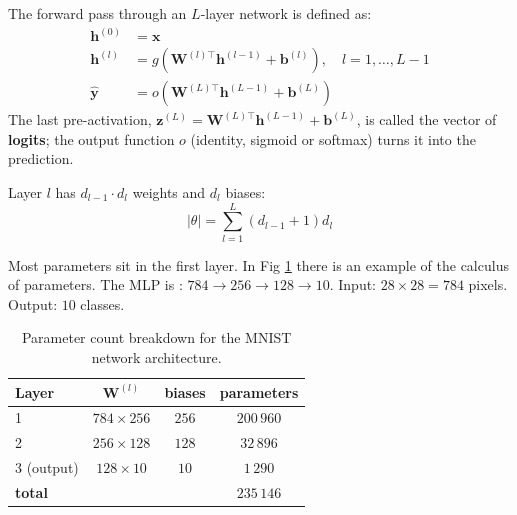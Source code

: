 The forward pass through an $L$-layer network is defined as:
\begin{align*}
    \mathbf{h}^{(0)} &= \mathbf{x} \\
    \mathbf{h}^{(l)} &= g(\mathbf{W}^{(l)\top} \mathbf{h}^{(l-1)} + \mathbf{b}^{(l)}), \quad l = 1, \dots, L - 1 \\
    \hat{\mathbf{y}} &= o(\mathbf{W}^{(L)\top} \mathbf{h}^{(L-1)} + \mathbf{b}^{(L)})
\end{align*}
\newline
The last pre-activation, $\mathbf{z}^{(L)} = \mathbf{W}^{(L)\top} \mathbf{h}^{(L-1)} + \mathbf{b}^{(L)}$, is called the vector of \textbf{logits}; the output function $o$ (identity, sigmoid or softmax) turns it into the prediction.

\begin{definition}
Layer $l$ has $d_{l-1} \cdot d_l$ weights and $d_l$ biases:
\begin{equation}
    |\theta| = \sum_{l=1}^{L} (d_{l-1} + 1) d_l
\end{equation}
\end{definition}
Most parameters sit in the first layer. In Fig \ref{tab:mnist_parameters} there is an example of 
the calculus of parameters. The MLP is : $784 \to 256 \to 128 \to 10$. 
Input: $28 \times 28 = 784$ pixels. Output: $10$ classes.

\begin{table}[H]
    \centering
    \begin{tabular}{lccc}
        \hline
        Layer & $\mathbf{W}^{(l)}$ & biases & parameters \\
        \hline
        1 & $784 \times 256$ & $256$ & $200\,960$ \\
        2 & $256 \times 128$ & $128$ & $32\,896$ \\
        3 (output) & $128 \times 10$ & $10$ & $1\,290$ \\
        \hline
        \textbf{total} & & & \textbf{$235\,146$} \\
        \hline
    \end{tabular}
    \caption{Parameter count breakdown for the MNIST network architecture.}
    \label{tab:mnist_parameters}
\end{table}